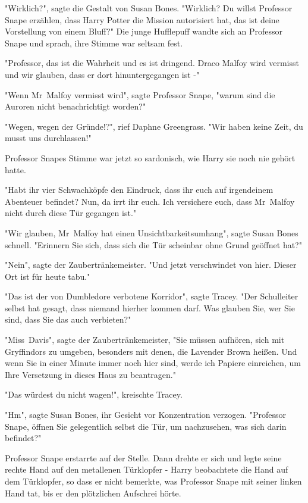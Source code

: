 {"Wirklich?", sagte die Gestalt von Susan Bones. "Wirklich? Du willst Professor Snape erzählen, dass Harry Potter die Mission autorisiert hat, das ist deine Vorstellung von einem Bluff?" Die junge Hufflepuff wandte sich an Professor Snape und sprach, ihre Stimme war seltsam fest.

"Professor, das ist die Wahrheit und es ist dringend. Draco Malfoy wird vermisst und wir glauben, dass er dort hinuntergegangen ist -"

"Wenn Mr~Malfoy vermisst wird", sagte Professor Snape, "warum sind die Auroren nicht benachrichtigt worden?"

"Wegen, wegen der Gründe!?", rief Daphne Greengrass. "Wir haben keine Zeit, du musst uns durchlassen!"

Professor Snapes Stimme war jetzt so sardonisch, wie Harry sie noch nie gehört hatte.

"Habt ihr vier Schwachköpfe den Eindruck, dass ihr euch auf irgendeinem Abenteuer befindet? Nun, da irrt ihr euch. Ich versichere euch, dass Mr~Malfoy nicht durch diese Tür gegangen ist."

"Wir glauben, Mr~Malfoy hat einen Unsichtbarkeitsumhang", sagte Susan Bones schnell. "Erinnern Sie sich, dass sich die Tür scheinbar ohne Grund geöffnet hat?"

"Nein", sagte der Zaubertränkemeister. "Und jetzt verschwindet von hier. Dieser Ort ist für heute tabu."

"Das ist der von Dumbledore verbotene Korridor", sagte Tracey. "Der Schulleiter selbst hat gesagt, dass niemand hierher kommen darf. Was glauben Sie, wer Sie sind, dass Sie das auch verbieten?"

"Miss~Davis", sagte der Zaubertränkemeister, "Sie müssen aufhören, sich mit Gryffindors zu umgeben, besonders mit denen, die Lavender Brown heißen. Und wenn Sie in einer Minute immer noch hier sind, werde ich Papiere einreichen, um Ihre Versetzung in dieses Haus zu beantragen."

"Das würdest du nicht wagen!", kreischte Tracey.

"Hm", sagte Susan Bones, ihr Gesicht vor Konzentration verzogen. "Professor Snape, öffnen Sie gelegentlich selbst die Tür, um nachzusehen, was sich darin befindet?"

Professor Snape erstarrte auf der Stelle. Dann drehte er sich und legte seine rechte Hand auf den metallenen Türklopfer - Harry beobachtete die Hand auf dem Türklopfer, so dass er nicht bemerkte, was Professor Snape mit seiner linken Hand tat, bis er den plötzlichen Aufschrei hörte.

}
